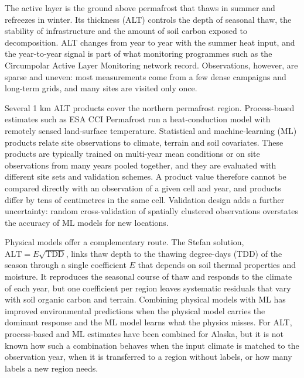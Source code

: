 The active layer is the ground above permafrost that thaws in summer and refreezes in winter. Its thickness (ALT) controls the depth of seasonal thaw, the stability of infrastructure and the amount of soil carbon exposed to decomposition\cite{Hjort2018,Schuur2015,Biskaborn2019}. ALT changes from year to year with the summer heat input, and the year-to-year signal is part of what monitoring programmes such as the Circumpolar Active Layer Monitoring network record\cite{Nelson1997,Streletskiy2025}. Observations, however, are sparse and uneven: most measurements come from a few dense campaigns and long-term grids, and many sites are visited only once\cite{Moore2025,Veremeeva2025}.

Several 1 km ALT products cover the northern permafrost region. Process-based estimates such as ESA CCI Permafrost run a heat-conduction model with remotely sensed land-surface temperature\cite{Westermann2024,Westermann2025}. Statistical and machine-learning (ML) products relate site observations to climate, terrain and soil covariates\cite{Aalto2018,Ran2022a,Liu2024,Wei2026}. These products are typically trained on multi-year mean conditions or on site observations from many years pooled together, and they are evaluated with different site sets and validation schemes. A product value therefore cannot be compared directly with an observation of a given cell and year, and products differ by tens of centimetres in the same cell. Validation design adds a further uncertainty: random cross-validation of spatially clustered observations overstates the accuracy of ML models for new locations\cite{Roberts2017,Ploton2020,MeyerPebesma2022,Wadoux2021}.

Physical models offer a complementary route. The Stefan solution, $\mathrm{ALT}=E\sqrt{\mathrm{TDD}}$, links thaw depth to the thawing degree-days (TDD) of the season through a single coefficient $E$ that depends on soil thermal properties and moisture\cite{Stefan1891,Riseborough2008}. It reproduces the seasonal course of thaw and responds to the climate of each year, but one coefficient per region leaves systematic residuals that vary with soil organic carbon and terrain. Combining physical models with ML has improved environmental predictions when the physical model carries the dominant response and the ML model learns what the physics misses\cite{Willard2022}. For ALT, process-based and ML estimates have been combined for Alaska\cite{Gautam2025}, but it is not known how such a combination behaves when the input climate is matched to the observation year, when it is transferred to a region without labels, or how many labels a new region needs.

